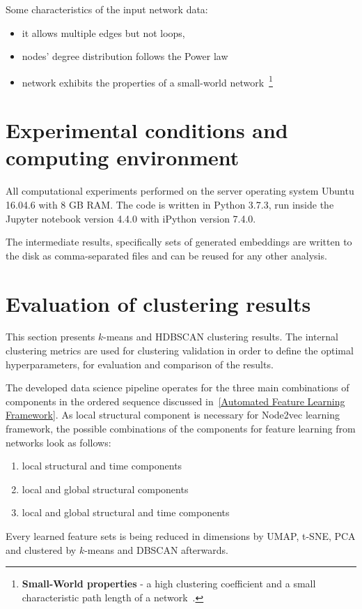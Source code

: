 Some characteristics of the input network data:
\begin{itemize}
    \item it allows multiple edges but not loops,
    \item nodes' degree distribution follows the Power law
    \item network exhibits the properties of a small-world network~\footnote{\textbf{Small-World properties} - a high  clustering coefficient and a small characteristic path length of a network~\cite{Mehlhorn2013}.}
\end{itemize}

\section{Experimental conditions and computing environment}

All computational experiments performed on the server operating system Ubuntu 16.04.6 with 8 GB RAM. The code is written in Python 3.7.3, run inside the Jupyter notebook version 4.4.0 with iPython version 7.4.0. 

The intermediate results, specifically sets of generated embeddings are written to the disk as comma-separated files and can be reused for any other analysis.

\section{Evaluation of clustering results}

This section presents $k$-means and HDBSCAN clustering results. The internal clustering metrics are used for clustering validation in order to define the optimal hyperparameters, for evaluation and comparison of the results.

The developed data science pipeline operates for the three main combinations of components in the ordered sequence discussed in~\ref{Automated Feature Learning Framework}. As local structural component is necessary for Node2vec learning framework, the possible combinations of the components for feature learning from networks look as follows: 
    \begin{enumerate}
        \item local structural and time components
        \item local and global structural components
        \item local and global structural and time components
    \end{enumerate}
Every learned feature sets is being reduced in dimensions by UMAP, t-SNE, PCA and clustered by $k$-means and DBSCAN afterwards. 

